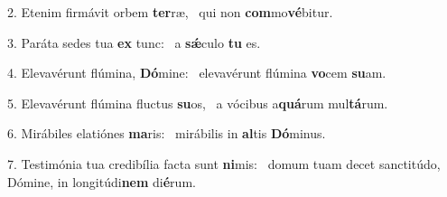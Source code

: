 2. Etenim firmávit orbem \textbf{ter}ræ, \ast\  qui non \textbf{com}mo\textbf{vé}bitur.\

3. Paráta sedes tua \textbf{ex} tunc: \ast\  a \textbf{sǽ}culo \textbf{tu} es.\

4. Elevavérunt flúmina, \textbf{Dó}mine: \ast\  elevavérunt flúmina \textbf{vo}cem \textbf{su}am.\

5. Elevavérunt flúmina fluctus \textbf{su}os, \ast\  a vócibus a\textbf{quá}rum mul\textbf{tá}rum.\

6. Mirábiles elatiónes \textbf{ma}ris: \ast\  mirábilis in \textbf{al}tis \textbf{Dó}minus.\

7. Testimónia tua credibília facta sunt \textbf{ni}mis: \ast\  domum tuam decet sanctitúdo, Dómine, in longitúdi\textbf{nem} di\textbf{é}rum.\

